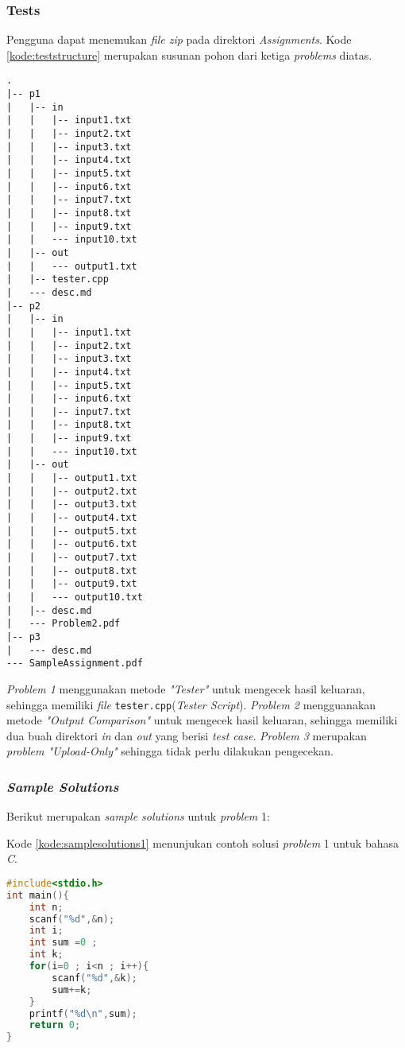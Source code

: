 \subsubsection{Tests}
Pengguna dapat menemukan \textit{file zip} pada direktori \textit{Assignments}. Kode \ref{kode:teststructure} merupakan susunan pohon dari ketiga \textit{problems} diatas.

\begin{lstlisting}[caption=Susunan pohon untuk ketiga \textit{problems}, label=kode:teststructure]
.
|-- p1
|   |-- in
|   |   |-- input1.txt
|   |   |-- input2.txt
|   |   |-- input3.txt
|   |   |-- input4.txt
|   |   |-- input5.txt
|   |   |-- input6.txt
|   |   |-- input7.txt
|   |   |-- input8.txt
|   |   |-- input9.txt
|   |   --- input10.txt
|   |-- out
|   |   --- output1.txt
|   |-- tester.cpp
|   --- desc.md
|-- p2
|   |-- in
|   |   |-- input1.txt
|   |   |-- input2.txt
|   |   |-- input3.txt
|   |   |-- input4.txt
|   |   |-- input5.txt
|   |   |-- input6.txt
|   |   |-- input7.txt
|   |   |-- input8.txt
|   |   |-- input9.txt
|   |   --- input10.txt
|   |-- out
|   |   |-- output1.txt
|   |   |-- output2.txt
|   |   |-- output3.txt
|   |   |-- output4.txt
|   |   |-- output5.txt
|   |   |-- output6.txt
|   |   |-- output7.txt
|   |   |-- output8.txt
|   |   |-- output9.txt
|   |   --- output10.txt
|   |-- desc.md
|   --- Problem2.pdf
|-- p3
|   --- desc.md
--- SampleAssignment.pdf
\end{lstlisting}

\textit{Problem 1} menggunakan metode \textit{"Tester"} untuk mengecek hasil keluaran, sehingga memiliki \textit{file} \verb|tester.cpp|(\textit{Tester Script}). \textit{Problem 2} mengguanakan metode \textit{"Output Comparison"} untuk mengecek hasil keluaran, sehingga memiliki dua buah direktori \textit{in} dan \textit{out} yang berisi \textit{test case}. \textit{Problem 3} merupakan \textit{problem "Upload-Only"} sehingga tidak perlu dilakukan pengecekan.

\subsubsection{\textit{Sample Solutions}}
Berikut merupakan \textit{sample solutions} untuk \textit{problem} 1:

Kode \ref{kode:samplesolutions1} menunjukan contoh solusi \textit{problem} 1 untuk bahasa \textit{C}.
\begin{lstlisting}[language=C, caption=Contoh solusi \textit{problem} 1 bahasa \textit{C}, label=kode:samplesolutions1]
#include<stdio.h>
int main(){
	int n;
	scanf("%d",&n);
	int i;
	int sum =0 ;
	int k;
	for(i=0 ; i<n ; i++){
		scanf("%d",&k);
		sum+=k;
	}
	printf("%d\n",sum);
	return 0;
}
\end{lstlisting}

